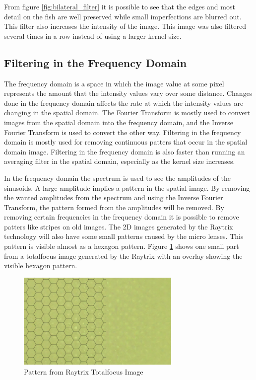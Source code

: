 From figure \ref{fig:bilateral_filter} it is possible to see that the edges and most detail on the fish are well preserved while small imperfections are blurred out. This filter also increases the intensity of the image. This image was also filtered several times in a row instead of using a larger kernel size.




\subsection{Filtering in the Frequency Domain}

The frequency domain is a space in which the image value at some pixel represents the amount that the intensity values vary over some distance. Changes done in the frequency domain affects the rate at which the intensity values are changing in the spatial domain.\cite{website:frequency_domain}
The Fourier Transform is mostly used to convert images from the spatial domain into the frequency domain, and the Inverse Fourier Transform is used to convert the other way. 
Filtering in the frequency domain is mostly used for removing continuous patters that occur in the spatial domain image.
Filtering in the frequency domain is also faster than running an averaging filter in the spatial domain, especially as the kernel size increases.\cite{website:frequency_domain_2}\cite{book:digital_image_processing}

In the frequency domain the spectrum is used to see the amplitudes of the sinusoids. A large amplitude implies a pattern in the spatial image. By removing the wanted amplitudes from the spectrum and using the Inverse Fourier Transform, the pattern formed from the amplitudes will be removed.
By removing certain frequencies in the frequency domain it is possible to remove patters like stripes on old images. The 2D images generated by the Raytrix technology will also have some small patterns caused by the micro lenses. This pattern is visible almost as a hexagon pattern.
Figure \ref{fig:hexagon_pattern} shows one small part from a totalfocus image generated by the Raytrix with an overlay showing the visible hexagon pattern.

\begin{figure}[ht]
    \centering
    \includegraphics[width=0.7\textwidth]{images/literature/filtering/pattern_totalfocus}
    \caption{Pattern from Raytrix Totalfocus Image}
    \label{fig:hexagon_pattern}
\end{figure}

